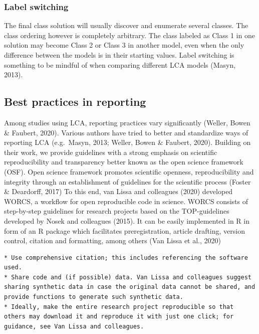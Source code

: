 \documentclass[
  ,man]{apa6}
\begin{document}
\hypertarget{label-switching}{%
\subsubsection{Label switching}\label{label-switching}}

The final class solution will usually discover and enumerate several classes.
The class ordering however is completely arbitrary.
The class labeled as Class 1 in one solution may become Class 2 or Class 3 in another model,
even when the only difference between the models is in their starting values.
Label switching is something to be mindful of when comparing different LCA models (Masyn, 2013).

\hypertarget{best-practices-in-reporting}{%
\subsection{Best practices in reporting}\label{best-practices-in-reporting}}

Among studies using LCA, reporting practices vary significantly (Weller, Bowen \& Faubert, 2020).
Various authors have tried to better and standardize ways of reporting LCA (e.g.~Masyn, 2013; Weller, Bowen \& Faubert, 2020).
Building on their work, we provide guidelines with a strong emphasis on scientific reproducibility and transparency
better known as the open science framework (OSF). Open science framework promotes scientific openness, reproducibility and integrity
through an establishment of guidelines for the scientific process (Foster \& Deardorff, 2017)
To this end, van Lissa and colleagues (2020) developed WORCS, a workflow for open reproducible code in science.
WORCS consists of step-by-step guidelines for research projects based on the TOP-guidelines developed by Nosek and colleagues (2015).
It can be easily implemented in R in form of an R package which facilitates preregistration, article drafting,
version control, citation and formatting, among others (Van Lissa et al., 2020)

\begin{verbatim}
* Use comprehensive citation; this includes referencing the software used.
* Share code and (if possible) data. Van Lissa and colleagues suggest sharing synthetic data in case the original data cannot be shared, and provide functions to generate such synthetic data.
* Ideally, make the entire research project reproducible so that others may download it and reproduce it with just one click; for guidance, see Van Lissa and colleagues.
\end{verbatim}
\end{document}

